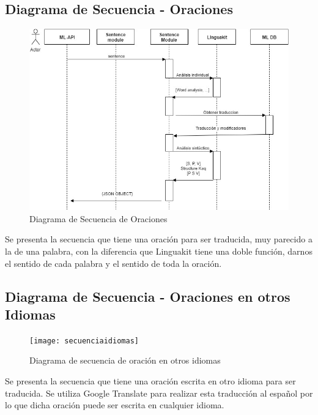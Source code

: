 \documentclass[a4paper,openright,11pt]{article}
\begin{document}
\subsection{Diagrama de Secuencia - Oraciones}
\begin{figure}[H]
	\centering
	\includegraphics[width=1.1\textwidth]{secuenciaoracion}
	\caption{Diagrama de Secuencia de Oraciones}
	\label{fig:seco}
\end{figure}
Se presenta la secuencia que tiene una oración para ser traducida, muy parecido a la de una palabra, con la diferencia que Linguakit tiene una doble función, darnos el sentido de cada palabra y el sentido de toda la oración.

\subsection{Diagrama de Secuencia - Oraciones en otros Idiomas}
\begin{figure}[H]
	\centering
	\texttt{[image: secuenciaidiomas]}
	\caption{Diagrama de secuencia de oración en otros idiomas}
	\label{fig:seci}
\end{figure}
Se presenta la secuencia que tiene una oración escrita en otro idioma para ser traducida. Se utiliza Google Translate para realizar esta traducción al español por lo que dicha oración puede ser escrita en cualquier idioma.

\newpage
\end{document}
